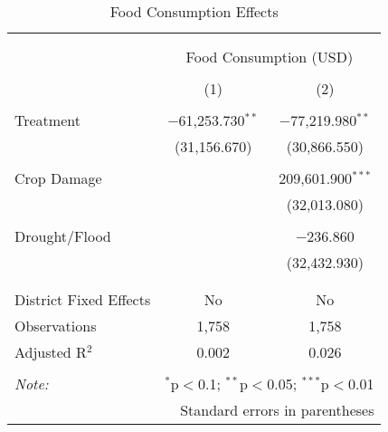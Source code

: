 
\begin{table}[!htbp] \centering 
  \caption{Food Consumption Effects} 
  \label{} 
\begin{tabular}{@{\extracolsep{5pt}}lcc} 
\\[-1.8ex]\hline 
\hline \\[-1.8ex] 
\\[-1.8ex] & \multicolumn{2}{c}{Food Consumption (USD)} \\ 
\\[-1.8ex] & (1) & (2)\\ 
\hline \\[-1.8ex] 
 Treatment & $-$61,253.730$^{**}$ & $-$77,219.980$^{**}$ \\ 
  & (31,156.670) & (30,866.550) \\ 
  & & \\ 
 Crop Damage &  & 209,601.900$^{***}$ \\ 
  &  & (32,013.080) \\ 
  & & \\ 
 Drought/Flood &  & $-$236.860 \\ 
  &  & (32,432.930) \\ 
  & & \\ 
\hline \\[-1.8ex] 
District Fixed Effects & No & No \\ 
Observations & 1,758 & 1,758 \\ 
Adjusted R$^{2}$ & 0.002 & 0.026 \\ 
\hline 
\hline \\[-1.8ex] 
\textit{Note:}  & \multicolumn{2}{r}{$^{*}$p$<$0.1; $^{**}$p$<$0.05; $^{***}$p$<$0.01} \\ 
 & \multicolumn{2}{r}{Standard errors in parentheses} \\ 
\end{tabular} 
\end{table} 
